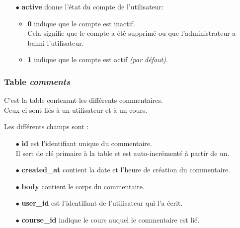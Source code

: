 \begin{itemize}
    \item[$\bullet$] \textbf{active} donne l'état du compte de l'utilisateur:
    
    \begin{itemize}
        
        \item \textbf{0} indique que le compte est inactif.\\
        Cela signifie que le compte a été supprimé ou que l'administrateur a banni l'utilisateur.
        
        \item \textbf{1} indique que le compte est actif \textit{(par défaut)}.
        
    \end{itemize}
    
\end{itemize}


\newpage


\subsubsection{Table \textit{comments}}
\label{sec:table-comments}
C'est la table contenant les différents commentaires.\\
Ceux-ci sont liés à un utilisateur et à un cours.

Les différents champs sont :

\begin{itemize}
    
    \item[$\bullet$] \textbf{id} est l'identifiant unique du commentaire.\\
    Il sert de clé primaire à la table et est auto-incrémenté à partir de un.
    
    \item[$\bullet$] \textbf{created\_at} contient la date et l'heure de création du commentaire.
    
    \item[$\bullet$] \textbf{body} contient le corps du commentaire.
    
    \item[$\bullet$] \textbf{user\_id} est l'identifiant de l'utilisateur qui l'a écrit.
    
    \item[$\bullet$] \textbf{course\_id} indique le cours auquel le commentaire est lié.
    
\end{itemize}


